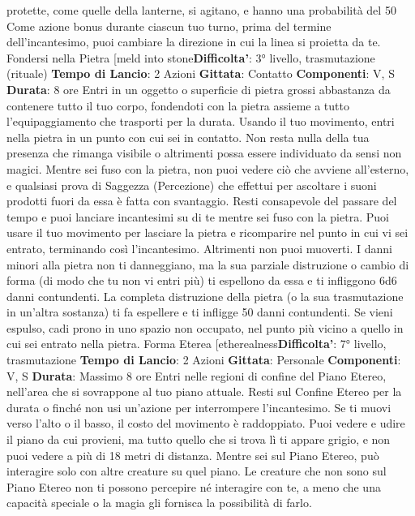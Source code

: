 \begin{multicols}{2}
protette, come quelle della lanterne, si agitano, e hanno
una probabilità del 50%
Come azione bonus durante ciascun tuo turno, prima
del termine dell’incantesimo, puoi cambiare la direzione
in cui la linea si proietta da te.
Fondersi nella Pietra
[meld into stone\textbf{Difficolta'}:
3° livello, trasmutazione (rituale)
\textbf{Tempo di Lancio}: 2 Azioni
\textbf{Gittata}: Contatto
\textbf{Componenti}: V, S
\textbf{Durata}: 8 ore
Entri in un oggetto o superficie di pietra grossi
abbastanza da contenere tutto il tuo corpo, fondendoti
con la pietra assieme a tutto l’equipaggiamento che
trasporti per la durata. Usando il tuo movimento, entri
nella pietra in un punto con cui sei in contatto. Non
resta nulla della tua presenza che rimanga visibile o
altrimenti possa essere individuato da sensi non magici.
Mentre sei fuso con la pietra, non puoi vedere ciò che
avviene all’esterno, e qualsiasi prova di Saggezza
(Percezione) che effettui per ascoltare i suoni prodotti
fuori da essa è fatta con svantaggio. Resti consapevole
del passare del tempo e puoi lanciare incantesimi su di
te mentre sei fuso con la pietra. Puoi usare il tuo
movimento per lasciare la pietra e ricomparire nel punto
in cui vi sei entrato, terminando così l’incantesimo.
Altrimenti non puoi muoverti.
I danni minori alla pietra non ti danneggiano, ma la sua
parziale distruzione o cambio di forma (di modo che tu
non vi entri più) ti espellono da essa e ti infliggono 6d6
danni contundenti. La completa distruzione della pietra
(o la sua trasmutazione in un’altra sostanza) ti fa
espellere e ti infligge 50 danni contundenti. Se vieni
espulso, cadi prono in uno spazio non occupato, nel
punto più vicino a quello in cui sei entrato nella pietra.
Forma Eterea
[etherealness\textbf{Difficolta'}:
7° livello, trasmutazione
\textbf{Tempo di Lancio}: 2 Azioni
\textbf{Gittata}: Personale
\textbf{Componenti}: V, S
\textbf{Durata}: Massimo 8 ore
Entri nelle regioni di confine del Piano Etereo, nell’area
che si sovrappone al tuo piano attuale. Resti sul
Confine Etereo per la durata o finché non usi un’azione
per interrompere l’incantesimo. Se ti muovi verso l’alto
o il basso, il costo del movimento è raddoppiato. Puoi
vedere e udire il piano da cui provieni, ma tutto quello
che si trova lì ti appare grigio, e non puoi vedere a più
di 18 metri di distanza.
Mentre sei sul Piano Etereo, può interagire solo con
altre creature su quel piano. Le creature che non sono
sul Piano Etereo non ti possono percepire né interagire
con te, a meno che una capacità speciale o la magia gli
fornisca la possibilità di farlo.

\end{multicols}
